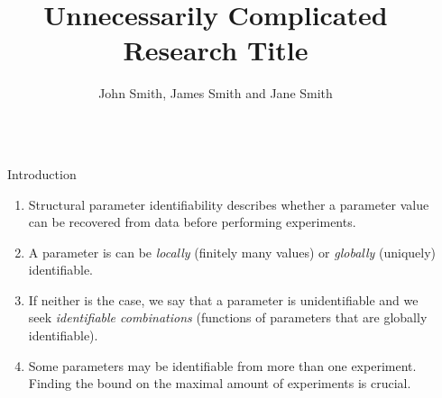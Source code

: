 \documentclass[final,hyperref={pdfpagelabels=false}]{beamer}
\title{\huge Unnecessarily Complicated Research Title} %
\author{John Smith, James Smith and Jane Smith} %
\institute{Department and University Name} %
\begin{document}

\begin{frame}[t] %

    \begin{columns}[t] %

        \begin{column}{.02\textwidth}\end{column} %

        \begin{column}{.465\textwidth} %


            \begin{block}{Introduction}

                \begin{enumerate}
                    \item Structural parameter identifiability describes whether a parameter value can be recovered from data before performing experiments.
                    \item A parameter is can be \emph{locally} (finitely many values) or \emph{globally} (uniquely) identifiable.
                    \item If neither is the case, we say that a parameter is unidentifiable and we seek \emph{identifiable combinations} (functions of parameters that are globally identifiable).
                    \item Some parameters may be identifiable from more than one experiment. Finding the bound on the maximal amount of experiments is crucial.
                \end{enumerate}

            \end{block}



\end{column}
\end{columns}
\end{frame}
\end{document}
